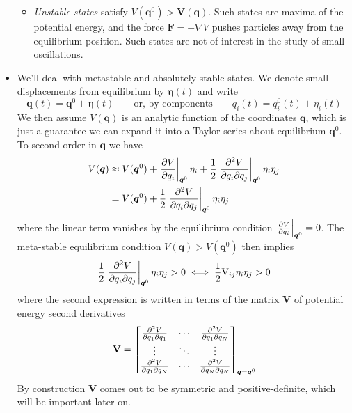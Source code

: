 \documentclass[11pt, a4paper]{article}
\newcommand{\eqtext}[1]{\qquad \text{#1} \qquad}
\newcommand{\mat}[1]{\mathbf{#1}}
\renewcommand{\grad}{\nabla }
\begin{document}
\begin{itemize}
\begin{itemize}
		\item \textit{Unstable states} satisfy $ V(\bm{q}^{0}) > \bm{V}(\bm{q}) $. Such states are maxima of the potential energy, and the force $ \bm{F} = - \grad V $ pushes particles away from the equilibrium position. Such states are not of interest in the study of small oscillations.
	\end{itemize}
	
	
	\item We'll deal with metastable and absolutely stable states. We denote small displacements from equilibrium by $ \bm{\eta}(t) $ and write
	\begin{equation*}
		\bm{q}(t) = \bm{q}^{0} + \bm{\eta}(t) \eqtext{or, by components} q_{i}(t) = q_{i}^{0}(t) + \eta_{i}(t)
	\end{equation*}
	We then assume $ V(\bm{q}) $ is an analytic function of the coordinates $ \bm{q} $, which is just a guarantee we can expand it into a Taylor series about equilibrium $ \bm{q}^{0} $. To second order in $ \bm{q} $ we have
	\begin{align*}
		V(\bm{q}) &\approx V(\bm{q}^{0}) + \eval{\pdv{V}{q_{i}}}_{\bm{q}^{0}} \eta_{i} + \frac{1}{2}\eval{\pdv{V}{q_{i}}{q_{j}}}_{\bm{q}^{0}}\eta_{i}\eta_{j}\\
		&=V(\bm{q}^{0}) + \frac{1}{2}\eval{\pdv{V}{q_{i}}{q_{j}}}_{\bm{q}^{0}}\eta_{i}\eta_{j}
	\end{align*}
	where the linear term vanishes by the equilibrium condition $\eval{\pdv{V}{q_{i}}}_{\bm{q}^{0}} = 0 $. The meta-stable equilibrium condition $ V(\bm{q}) > V(\bm{q}^{0}) $ then implies
	\begin{equation*}
		\frac{1}{2}\eval{\pdv{V}{q_{i}}{q_{j}}}_{\bm{q}^{0}}\eta_{i}\eta_{j} > 0 \iff \frac{1}{2} \mathrm{V}_{ij}\eta_{i}\eta_{j} > 0
	\end{equation*}
	where the second expression is written in terms of the matrix $ \mat{V} $ of potential energy second derivatives
	\begin{equation*}
		\mat{V} =
		\begin{bmatrix}
			\pdv{V}{q_1}{q_{1}} & \cdots & \pdv{V}{q_{1}}{q_N}\\
			\vdots & \ddots & \vdots\\
			\pdv{V}{q_1}{q_{N}} & \cdots & \pdv{V}{q_N}{q_{N}}\\
		\end{bmatrix}_{\bm{q} = \bm{q}^{0}}
	\end{equation*}
	By construction $ \mat{V} $ comes out to be symmetric and positive-definite, which will be important later on.
	

\end{itemize}
\end{document}
